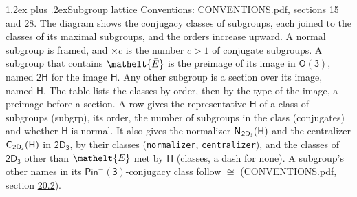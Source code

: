 \documentclass[10pt,a4paper]{article}
\makeatletter
\renewcommand\section{\@startsection{section}{1}{\z@}{-3ex plus -1ex minus -.2ex}%
  {1.2ex plus .2ex}{\normalfont\large\sffamily\bfseries\color{parttitle}}}
\numberwithin{equation}{section}
\newcommand{\eltfont}[1]{{\let\sigma\eltsigma\mathelt{#1}}}
\newcommand{\grp}[1]{\mathsf{#1}}
\newcommand{\cls}[1]{\eltfont{#1}}
\newcommand{\elt}[1]{\eltfont{#1}}
\newcommand{\samecls}{\cong}
\newcommand{\nconj}[1]{{\scriptsize$\times#1$}}
\newcommand{\barred}[1]{\bar{#1}}
\newcommand{\hairsp}{\mkern1mu}
\makeatother
\begin{document}
\section{Subgroup lattice}\label{s:subgroups}
Conventions: \href{../../CONVENTIONS.pdf}{CONVENTIONS.pdf}, sections \href{../../../rotation/CONVENTIONS.pdf\#conv.15}{15} and \href{../../CONVENTIONS.pdf\#conv.28}{28}.
The diagram shows the conjugacy classes of subgroups, each joined to the classes of its maximal subgroups, and the orders increase upward. A normal subgroup is framed, and ${\times}c$ is the number $c > 1$ of conjugate subgroups. \label{n:group.H}A subgroup that contains $\elt{\barred{E}}$ is the preimage of its image in $\grp{O(3)}$, named $\grp{2H}$ for the image $\grp{H}$. Any other subgroup is a section over its image, named $\grp{H}$. The table lists the classes by order, then by the type of the image, a preimage before a section. \label{n:head.subgroup}\label{n:head.order}\label{n:head.conjugates}\label{n:head.normal}A row gives the representative $\grp{H}$ of a class of subgroups (subgrp), its order, the number of subgroups in the class (conjugates) and whether $\grp{H}$ is normal. \label{n:group.normalizer}\label{n:group.centralizer}\label{n:head.classes}It also gives the normalizer $\grp{N}_{\hairsp \grp{2D_{3}}}(\grp{H})$ and the centralizer $\grp{C}_{\hairsp \grp{2D_{3}}}(\grp{H})$ in $\grp{2D_{3}}$, by their classes (\texttt{normalizer}, \texttt{centralizer}), and the classes of $\grp{2D_{3}}$ other than $\cls{E}$ met by $\grp{H}$ (classes, a dash for none). A subgroup's other names in its \href{Pinminus3.pdf}{$\grp{Pin^{-}(3)}$}-conjugacy class follow $\samecls$ (\href{../../CONVENTIONS.pdf}{CONVENTIONS.pdf}, section \href{../../CONVENTIONS.pdf\#conv.20.2}{20.2}).
\begin{center}
\end{center}
\end{document}
